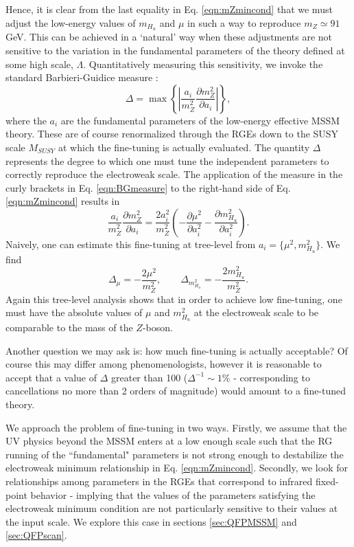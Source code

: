Hence, it is clear from the last equality in Eq. \ref{eqn:mZmincond} that we must adjust the low-energy values of $m_{H_u}$ and $\mu$ in such a way to reproduce $m_Z \simeq 91$ GeV. This can be achieved in a `natural' way when these adjustments are not sensitive to the variation in the fundamental parameters of the theory defined at some high scale, $\Lambda$. Quantitatively measuring this sensitivity, we invoke the standard Barbieri-Guidice measure \cite{RN239}:
\begin{equation}
\Delta = \max \left\{\left| \frac{a_i}{m^2_Z}\frac{\partial m^2_Z}{\partial a_i} \right| \right \},
\label{eqn:BGmeasure}
\end{equation}
where the $a_i$ are the fundamental parameters of the low-energy effective MSSM theory. These are of course renormalized through the RGEs down to the SUSY scale $M_{SUSY}$ at which the fine-tuning is actually evaluated. The quantity $\Delta$ represents the degree to which one must tune the independent parameters to correctly reproduce the electroweak scale. The application of the measure in the curly brackets in Eq. \ref{eqn:BGmeasure} to the right-hand side of Eq. \ref{eqn:mZmincond} results in
\begin{equation}
\frac{a_i}{m^2_Z}\frac{\partial m^2_Z}{\partial a_i}=\frac{2 a^2_i}{m^2_Z}\left( -\frac{\partial \mu^2}{\partial a^2_i} -\frac{\partial m^2_{H_u}}{\partial a^2_i} \right).
\end{equation}
Naively, one can estimate this fine-tuning at tree-level from $a_i=\{\mu^2,m^2_{H_u}\}$. We find
\begin{equation}
\Delta_{\mu} = -\frac{2\mu^2}{m^2_Z},\qquad \Delta_{m^2_{H_u}} = -\frac{2 m^2_{H_u}}{m^2_Z}.
\end{equation}
Again this tree-level analysis shows that in order to achieve low fine-tuning, one must have the absolute values of $\mu$ and $m^2_{H_u}$ at the electroweak scale to be comparable to the mass of the $Z$-boson.

Another question we may ask is: how much fine-tuning is actually acceptable? Of course this may differ among phenomenologists, however it is reasonable to accept that a value of $\Delta$ greater than 100 ($\Delta^{-1} \sim 1\%$ - corresponding to cancellations no more than 2 orders of magnitude) would amount to a fine-tuned theory. 

We approach the problem of fine-tuning in two ways. Firstly, we assume that the UV physics beyond the MSSM enters at a low enough scale such that the RG running of the ``fundamental" parameters is not strong enough to destabilize the electroweak minimum relationship in Eq. \ref{eqn:mZmincond}. Secondly, we look for relationships among parameters in the RGEs that correspond to infrared fixed-point behavior - implying that the values of the parameters satisfying the electroweak minimum condition are not particularly sensitive to their values at the input scale. We explore this case in sections \ref{sec:QFPMSSM} and \ref{sec:QFPscan}.

